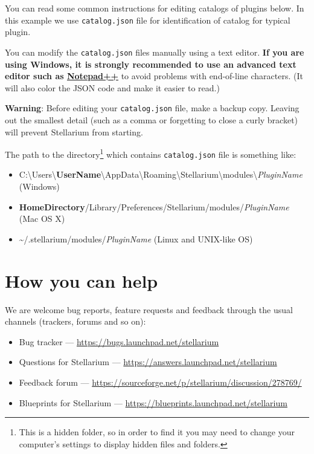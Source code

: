You can read some common instructions for editing catalogs of plugins
below. In this example we use \texttt{catalog.json} file for
identification of catalog for typical plugin.

You can modify the \texttt{catalog.json} files manually using a text
editor. \textbf{If you are using Windows, it is strongly recommended to
use an advanced text editor such as
\href{http://notepad-plus-plus.org/}{Notepad++}} to avoid problems with
end-of-line characters. (It will also color the JSON code and make it
easier to read.)

\textbf{Warning}: Before editing your \texttt{catalog.json} file, make a
backup copy. Leaving out the smallest detail (such as a comma or
forgetting to close a curly bracket) will prevent Stellarium from
starting.

The path to the directory\footnote{This is a hidden folder, so in order to find it you may need to change your computer's settings to display hidden files and folders.} which contains \texttt{catalog.json} file is
something like:

\begin{itemize}
\item
  C:\textbackslash Users\textbackslash\textbf{UserName}\textbackslash AppData\textbackslash Roaming\textbackslash Stellarium\textbackslash modules\textbackslash \textit{PluginName}\\ (Windows)
\item
  \textbf{HomeDirectory}/Library/Preferences/Stellarium/modules/\textit{PluginName}\\ (Mac OS X)
\item
  \textasciitilde{}/.stellarium/modules/\textit{PluginName} (Linux and UNIX-like OS)
\end{itemize}

\section{How you can help}\label{how-you-can-help}

We are welcome bug reports, feature requests and feedback through the
usual channels (trackers, forums and so on):
\begin{itemize}
\item Bug tracker --- \url{https://bugs.launchpad.net/stellarium}
\item Questions for Stellarium --- \url{https://answers.launchpad.net/stellarium}
\item Feedback forum --- \url{https://sourceforge.net/p/stellarium/discussion/278769/}
\item Blueprints for Stellarium --- \url{https://blueprints.launchpad.net/stellarium}
\end{itemize}

